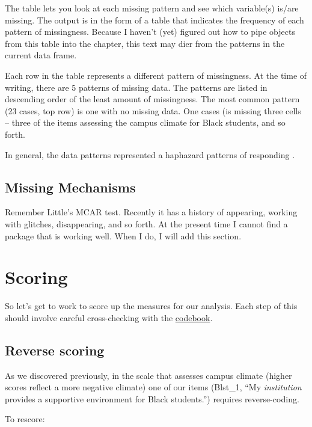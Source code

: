 \documentclass[
  english,
]{book}
\begin{document}
The table lets you look at each missing pattern and see which variable(s) is/are missing. The output is in the form of a table that indicates the frequency of each pattern of missingness. Because I haven't (yet) figured out how to pipe objects from this table into the chapter, this text may dier from the patterns in the current data frame.

Each row in the table represents a different pattern of missingness. At the time of writing, there are 5 patterns of missing data. The patterns are listed in descending order of the least amount of missingness. The most common pattern (23 cases, top row) is one with no missing data. One cases (is missing three cells -- three of the items assessing the campus climate for Black students, and so forth.

In general, the data patterns represented a haphazard patterns of responding \citep{enders_applied_2010}.

\hypertarget{missing-mechanisms}{%
\subsection{Missing Mechanisms}\label{missing-mechanisms}}

Remember Little's MCAR test. Recently it has a history of appearing, working with glitches, disappearing, and so forth. At the present time I cannot find a package that is working well. When I do, I will add this section.

\hypertarget{scoring}{%
\section{Scoring}\label{scoring}}

So let's get to work to score up the measures for our analysis. Each step of this should involve careful cross-checking with the \href{./Rate-a-Course_Codebook.pdf}{codebook}.

\hypertarget{reverse-scoring}{%
\subsection{Reverse scoring}\label{reverse-scoring}}

As we discovered previously, in the scale that assesses campus climate (higher scores reflect a more negative climate) one of our items (Blst\_1, ``My \emph{institution} provides a supportive environment for Black students.'') requires reverse-coding.

To rescore:
\end{document}

